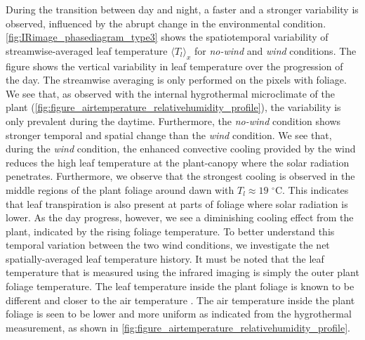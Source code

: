 During the transition between day and night, a faster and a stronger variability is observed, influenced by the abrupt change in the environmental condition. \cref{fig:IRimage_phasediagram_type3} shows the spatiotemporal variability of streamwise-averaged leaf temperature $\langle T_l \rangle_x$ for \textit{no-wind} and \textit{wind} conditions. The figure shows the vertical variability in leaf temperature over the progression of the day. The streamwise averaging is only performed on the pixels with foliage. We see that, as observed with the internal hygrothermal microclimate of the plant (\cref{fig:figure_airtemperature_relativehumidity_profile}), the variability is only prevalent during the daytime. Furthermore, the \textit{no-wind} condition shows stronger temporal and spatial change than the \textit{wind} condition. We see that, during the \textit{wind} condition, the enhanced convective cooling provided by the wind reduces the high leaf temperature at the plant-canopy where the solar radiation penetrates. Furthermore, we observe that the strongest cooling is observed in the middle regions of the plant foliage around dawn with $T_l\approx19$ $^{\circ}$C. This indicates that leaf transpiration is also present at parts of foliage where solar radiation is lower. As the day progress, however, we see a diminishing cooling effect from the plant, indicated by the rising foliage temperature. To better understand this temporal variation between the two wind conditions, we investigate the net spatially-averaged leaf temperature history. It must be noted that the leaf temperature that is measured using the infrared imaging is simply the outer plant foliage temperature. The leaf temperature inside the plant foliage is known to be different and closer to the air temperature \citep{Manickathan2018a}. The air temperature inside the plant foliage is seen to be lower and more uniform as indicated from the hygrothermal measurement, as shown in \cref{fig:figure_airtemperature_relativehumidity_profile}.

